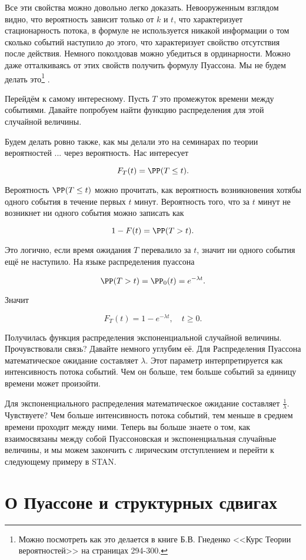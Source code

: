 Все эти свойства можно довольно легко доказать. Невооруженным взглядом видно, что вероятность зависит только от $k$ и $t$, что характеризует стационарность потока, в формуле не используется никакой информации о том сколько событий наступило до этого, что характеризует свойство отсутствия после действия. Немного поколдовав можно убедиться в ординарности. Можно даже отталкиваясь от этих свойств получить формулу Пуассона.  Мы не будем делать это\footnote{Можно посмотреть как это делается в книге Б.В. Гнеденко <<Курс Теории вероятностей>> на страницах 294-300.} . 

Перейдём к самому интересному. Пусть $T$ это промежуток времени между событиями. Давайте попробуем найти функцию распределения для этой случайной величины. 

Будем делать ровно также, как мы делали это на семинарах по теории вероятностей ... через вероятность. Нас интересует 

\[ F_T(t) = \PP(T \le t).\]

Вероятность $\PP(T \le t)$ можно прочитать, как вероятность возникновения хотябы одного события в течение первых $t$ минут. Вероятность того, что за $t$ минут не возникнет ни одного события можно записать как 

\[1 - F(t) = \PP(T > t).\]

Это логично, если время ожидания $T$ перевалило за $t$, значит ни одного события ещё не наступило. На языке распределения пуассона 

\[\PP(T > t) = \PP_0(t) = e^{-\lambda t}.\] 

Значит 

\[ F_T(t) = 1 - e^{-\lambda t}, \quad t \ge 0.\]

Получилась функция распределения экспоненциальной случайной величины. Прочувствовали связь?  Давайте немного углубим её. Для Распределения Пуассона математическое ожидание составляет $\lambda$. Этот параметр интерпретируется как интенсивность потока событий. Чем он больше, тем больше событий за единицу времени может произойти. 

Для экспоненциального распределения математическое ожидание составляет $\frac{1}{\lambda}$. Чувствуете? Чем больше интенсивность потока событий, тем меньше в среднем времени проходит между ними.  Теперь вы больше знаете о том, как взаимосвязаны между собой Пуассоновская и экспоненциальная случайные величины, и мы можем закончить с лирическим отступлением и перейти к следующему примеру в STAN. 

\section{О Пуассоне и структурных сдвигах} 

